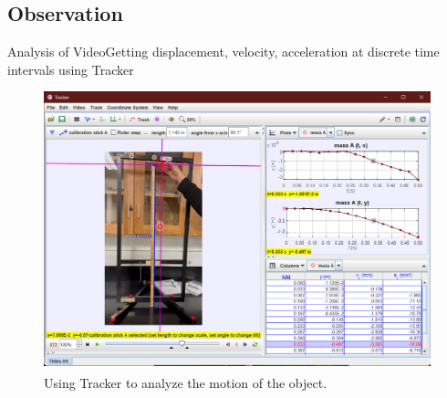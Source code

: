 




\subsection{Observation}
\begin{frame}{Analysis of Video}{Getting displacement, velocity, acceleration at discrete time intervals using Tracker}
\begin{figure}
\centering
    \includegraphics[height=0.7\textheight]{img/trackerSS}
    \caption{Using Tracker\textsuperscript{\textregistered} to analyze the motion of the object.}
    \label{fig:trackerSS}
\end{figure}
\end{frame}

